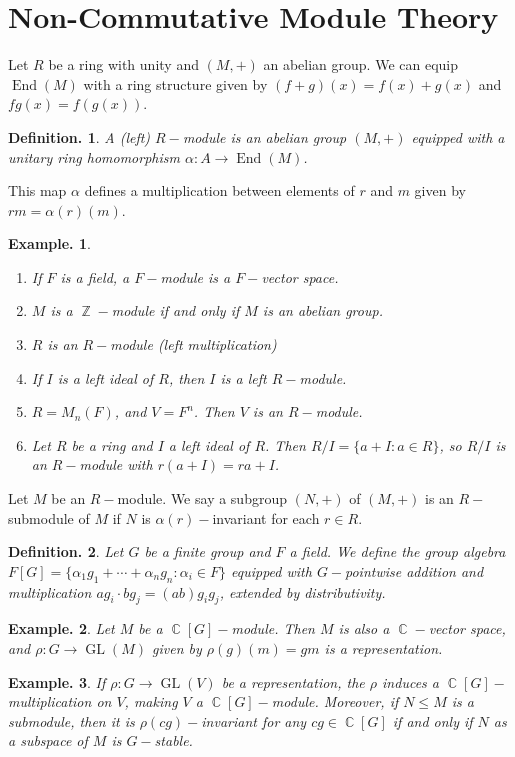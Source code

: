 \documentclass[11pt, a4paper]{memoir}
\DeclareMathOperator{\Z}{{\mathbb{Z}}}
\DeclareMathOperator{\C}{{\mathbb{C}}}
\theoremstyle{change}
\theoremstyle{plain}
\theoremstyle{nonumberplain}
\newtheorem{definition}{Definition.}
\newtheorem{example}{Example.}
\DeclareMathOperator{\End}{End}
\DeclareMathOperator{\GL}{GL}
\numberwithin{equation}{section}
\begin{document}
\section{Non-Commutative Module Theory}
Let $R$ be a ring with unity and $(M,+)$ an abelian group.
We can equip $\End(M)$ with a ring structure given by $(f+g)(x)=f(x)+g(x)$ and $fg(x)=f(g(x))$.
\begin{definition}
    A (left) $R-$module is an abelian group $(M,+)$ equipped with a unitary ring homomorphism $\alpha:A\to\End(M)$.
\end{definition}
This map $\alpha$ defines a multiplication between elements of $r$ and $m$ given by $rm=\alpha(r)(m)$.
\begin{example}
    \begin{enumerate}[nl,r]
        \item If $F$ is a field, a $F-$module is a $F-$vector space.
        \item $M$ is a $\Z-$module if and only if $M$ is an abelian group.
        \item $R$ is an $R-$module (left multiplication)
        \item If $I$ is a left ideal of $R$, then $I$ is a left $R-$module.
        \item $R=M_n(F)$, and $V=F^n$.
            Then $V$ is an $R-$module.
        \item Let $R$ be a ring and $I$ a left ideal of $R$.
            Then $R/I=\{a+I:a\in R\}$, so $R/I$ is an $R-$module with $r(a+I)=ra+I$.
    \end{enumerate}
\end{example}
Let $M$ be an $R-$module.
We say a subgroup $(N,+)$ of $(M,+)$ is an $R-$submodule of $M$ if $N$ is $\alpha(r)-$invariant for each $r\in R$.
\begin{definition}
    Let $G$ be a finite group and $F$ a field.
    We define the group algebra $F[G]=\{\alpha_1g_1+\cdots+\alpha_ng_n:\alpha_i\in F\}$ equipped with $G-$pointwise addition and multiplication $ag_i\cdot bg_j=(ab)g_ig_j$, extended by distributivity.
\end{definition}
\begin{example}
    Let $M$ be a $\C[G]-$module.
    Then $M$ is also a $\C-$vector space, and $\rho:G\to\GL(M)$ given by $\rho(g)(m)=gm$ is a representation.
\end{example}
\begin{example}
    If $\rho:G\to\GL(V)$ be a representation, the $\rho$ induces a $\C[G]-$multiplication on $V$, making $V$ a $\C[G]-$module.
    Moreover, if $N\leq M$ is a submodule, then it is $\rho(cg)-$invariant for any $cg\in\C[G]$ if and only if $N$ as a subspace of $M$ is $G-$stable.
\end{example}
\end{document}
